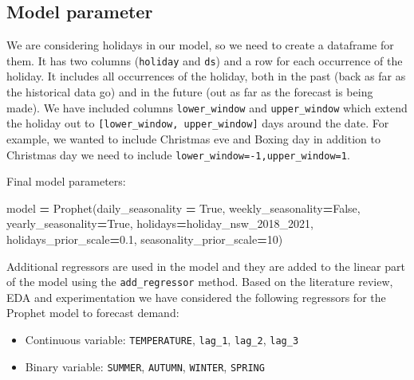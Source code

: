 \documentclass[mstat,12pt]{unswthesis}
\newenvironment{Shaded}{\begin{snugshade}}{\end{snugshade}}
\newcommand{\DecValTok}[1]{\textcolor[rgb]{0.00,0.00,0.81}{#1}}
\newcommand{\FloatTok}[1]{\textcolor[rgb]{0.00,0.00,0.81}{#1}}
\newcommand{\NormalTok}[1]{#1}
\newcommand{\OperatorTok}[1]{\textcolor[rgb]{0.81,0.36,0.00}{\textbf{#1}}}
\newcommand{\VariableTok}[1]{\textcolor[rgb]{0.00,0.00,0.00}{#1}}
\begin{document}
\subsection{Model parameter}\label{model-parameter}

We are considering holidays in our model, so we need to create a
dataframe for them. It has two columns (\texttt{holiday} and
\texttt{ds}) and a row for each occurrence of the holiday. It includes
all occurrences of the holiday, both in the past (back as far as the
historical data go) and in the future (out as far as the forecast is
being made). We have included columns \texttt{lower\_window} and
\texttt{upper\_window} which extend the holiday out to
\texttt{{[}lower\_window,\ upper\_window{]}} days around the date. For
example, we wanted to include Christmas eve and Boxing day in addition
to Christmas day we need to include
\texttt{lower\_window=-1,upper\_window=1}.

Final model parameters:

\begin{Shaded}
\begin{Highlighting}[]
\NormalTok{model }\OperatorTok{=}\NormalTok{ Prophet(daily\_seasonality }\OperatorTok{=} \VariableTok{True}\NormalTok{, }
\NormalTok{                weekly\_seasonality}\OperatorTok{=}\VariableTok{False}\NormalTok{, }
\NormalTok{                yearly\_seasonality}\OperatorTok{=}\VariableTok{True}\NormalTok{,   }
\NormalTok{                holidays}\OperatorTok{=}\NormalTok{holiday\_nsw\_2018\_2021, }
\NormalTok{                holidays\_prior\_scale}\OperatorTok{=}\FloatTok{0.1}\NormalTok{, }
\NormalTok{                seasonality\_prior\_scale}\OperatorTok{=}\DecValTok{10}\NormalTok{)}
\end{Highlighting}
\end{Shaded}

Additional regressors are used in the model and they are added to the
linear part of the model using the \texttt{add\_regressor} method. Based
on the literature review, EDA and experimentation we have considered the
following regressors for the Prophet model to forecast demand:

\begin{itemize}
\item
  Continuous variable: \texttt{TEMPERATURE}, \texttt{lag\_1},
  \texttt{lag\_2}, \texttt{lag\_3}
\item
  Binary variable: \texttt{SUMMER}, \texttt{AUTUMN}, \texttt{WINTER},
  \texttt{SPRING}
\end{itemize}
\end{document}
